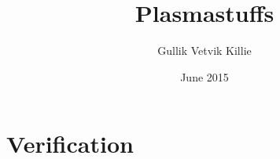 \documentclass[x11names,twoside,english]{uiofysmaster}
\author{Gullik Vetvik Killie}
\title{Plasmastuffs}
\date{June 2015}
\begin{document}
% 

%
% 
%
% 
\chapter{Verification}

%
% 
%
% 
%
% 
%
%
% 
% 
% 
% 


% 
%
%
% 
% 
% 
% 

%
\end{document}
